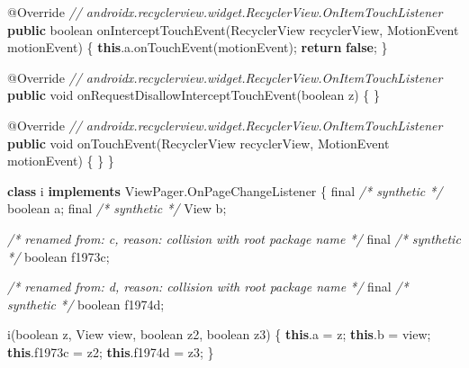 \documentclass[
]{article}
\newenvironment{Shaded}{}{}
\newcommand{\AttributeTok}[1]{\textcolor[rgb]{0.49,0.56,0.16}{#1}}
\newcommand{\BuiltInTok}[1]{\textcolor[rgb]{0.00,0.50,0.00}{#1}}
\newcommand{\CommentTok}[1]{\textcolor[rgb]{0.38,0.63,0.69}{\textit{#1}}}
\newcommand{\ControlFlowTok}[1]{\textcolor[rgb]{0.00,0.44,0.13}{\textbf{#1}}}
\newcommand{\DataTypeTok}[1]{\textcolor[rgb]{0.56,0.13,0.00}{#1}}
\newcommand{\FunctionTok}[1]{\textcolor[rgb]{0.02,0.16,0.49}{#1}}
\newcommand{\KeywordTok}[1]{\textcolor[rgb]{0.00,0.44,0.13}{\textbf{#1}}}
\newcommand{\NormalTok}[1]{#1}
\newcommand{\OperatorTok}[1]{\textcolor[rgb]{0.40,0.40,0.40}{#1}}
\begin{document}
\begin{Shaded}
\begin{Highlighting}[]
        \AttributeTok{@Override} \CommentTok{// androidx.recyclerview.widget.RecyclerView.OnItemTouchListener}
        \KeywordTok{public} \DataTypeTok{boolean} \FunctionTok{onInterceptTouchEvent}\OperatorTok{(}\NormalTok{RecyclerView recyclerView}\OperatorTok{,}\NormalTok{ MotionEvent motionEvent}\OperatorTok{)} \OperatorTok{\{}
            \KeywordTok{this}\OperatorTok{.}\FunctionTok{a}\OperatorTok{.}\FunctionTok{onTouchEvent}\OperatorTok{(}\NormalTok{motionEvent}\OperatorTok{);}
            \ControlFlowTok{return} \KeywordTok{false}\OperatorTok{;}
        \OperatorTok{\}}

        \AttributeTok{@Override} \CommentTok{// androidx.recyclerview.widget.RecyclerView.OnItemTouchListener}
        \KeywordTok{public} \DataTypeTok{void} \FunctionTok{onRequestDisallowInterceptTouchEvent}\OperatorTok{(}\DataTypeTok{boolean}\NormalTok{ z}\OperatorTok{)} \OperatorTok{\{}
        \OperatorTok{\}}

        \AttributeTok{@Override} \CommentTok{// androidx.recyclerview.widget.RecyclerView.OnItemTouchListener}
        \KeywordTok{public} \DataTypeTok{void} \FunctionTok{onTouchEvent}\OperatorTok{(}\NormalTok{RecyclerView recyclerView}\OperatorTok{,}\NormalTok{ MotionEvent motionEvent}\OperatorTok{)} \OperatorTok{\{}
        \OperatorTok{\}}
    \OperatorTok{\}}

    \KeywordTok{class}\NormalTok{ i }\KeywordTok{implements}\NormalTok{ ViewPager}\OperatorTok{.}\FunctionTok{OnPageChangeListener} \OperatorTok{\{}
        \DataTypeTok{final} \CommentTok{/* synthetic */} \DataTypeTok{boolean}\NormalTok{ a}\OperatorTok{;}
        \DataTypeTok{final} \CommentTok{/* synthetic */} \BuiltInTok{View}\NormalTok{ b}\OperatorTok{;}

        \CommentTok{/* renamed from: c, reason: collision with root package name */}
        \DataTypeTok{final} \CommentTok{/* synthetic */} \DataTypeTok{boolean}\NormalTok{ f1973c}\OperatorTok{;}

        \CommentTok{/* renamed from: d, reason: collision with root package name */}
        \DataTypeTok{final} \CommentTok{/* synthetic */} \DataTypeTok{boolean}\NormalTok{ f1974d}\OperatorTok{;}

        \FunctionTok{i}\OperatorTok{(}\DataTypeTok{boolean}\NormalTok{ z}\OperatorTok{,} \BuiltInTok{View}\NormalTok{ view}\OperatorTok{,} \DataTypeTok{boolean}\NormalTok{ z2}\OperatorTok{,} \DataTypeTok{boolean}\NormalTok{ z3}\OperatorTok{)} \OperatorTok{\{}
            \KeywordTok{this}\OperatorTok{.}\FunctionTok{a} \OperatorTok{=}\NormalTok{ z}\OperatorTok{;}
            \KeywordTok{this}\OperatorTok{.}\FunctionTok{b} \OperatorTok{=}\NormalTok{ view}\OperatorTok{;}
            \KeywordTok{this}\OperatorTok{.}\FunctionTok{f1973c} \OperatorTok{=}\NormalTok{ z2}\OperatorTok{;}
            \KeywordTok{this}\OperatorTok{.}\FunctionTok{f1974d} \OperatorTok{=}\NormalTok{ z3}\OperatorTok{;}
        \OperatorTok{\}}


\end{Highlighting}
\end{Shaded}
\end{document}
